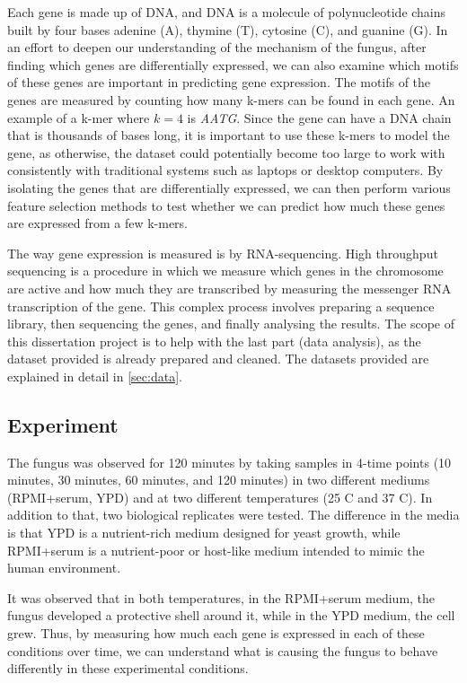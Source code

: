 \documentclass[11pt,twoside]{article}
\numberwithin{Theorem}{section}
\numberwithin{Definition}{section}
\numberwithin{Lemma}{section}
\numberwithin{Algorithm}{section}
\numberwithin{equation}{section}
\begin{document}
Each gene is made up of DNA, and DNA is a molecule of polynucleotide chains built by four bases adenine (A), thymine (T), cytosine (C), and guanine (G). In an effort to deepen our understanding of the mechanism of the fungus, after finding which genes are differentially expressed, we can also examine which motifs of these genes are important in predicting gene expression. The motifs of the genes are measured by counting how many k-mers can be found in each gene. An example of a k-mer where $k=4$ is \emph{AATG}. Since the gene can have a DNA chain that is thousands of bases long, it is important to use these k-mers to model the gene, as otherwise, the dataset could potentially become too large to work with consistently with traditional systems such as laptops or desktop computers. By isolating the genes that are differentially expressed, we can then perform various feature selection methods to test whether we can predict how much these genes are expressed from a few k-mers.

The way gene expression is measured is by RNA-sequencing. High throughput sequencing is a procedure in which we measure which genes in the chromosome are active and how much they are transcribed by measuring the messenger RNA transcription of the gene. This complex process involves preparing a sequence library, then sequencing the genes, and finally analysing the results. The scope of this dissertation project is to help with the last part (data analysis), as the dataset provided is already prepared and cleaned. The datasets provided are explained in detail in \autoref{sec:data}.  

\subsection{Experiment}
\label{sec:experiment}

The fungus was observed for 120 minutes by taking samples in 4-time points (10 minutes, 30 minutes, 60 minutes, and 120 minutes) in two different mediums (RPMI+serum, YPD) and at two different temperatures (25 C and 37 C). In addition to that, two biological replicates were tested. The difference in the media is that YPD is a nutrient-rich medium designed for yeast growth, while RPMI+serum is a nutrient-poor or host-like medium intended to mimic the human environment. 

It was observed that in both temperatures, in the RPMI+serum medium, the fungus developed a protective shell around it, while in the YPD medium, the cell grew. Thus, by measuring how much each gene is expressed in each of these conditions over time, we can understand what is causing the fungus to behave differently in these experimental conditions. 
\end{document}
